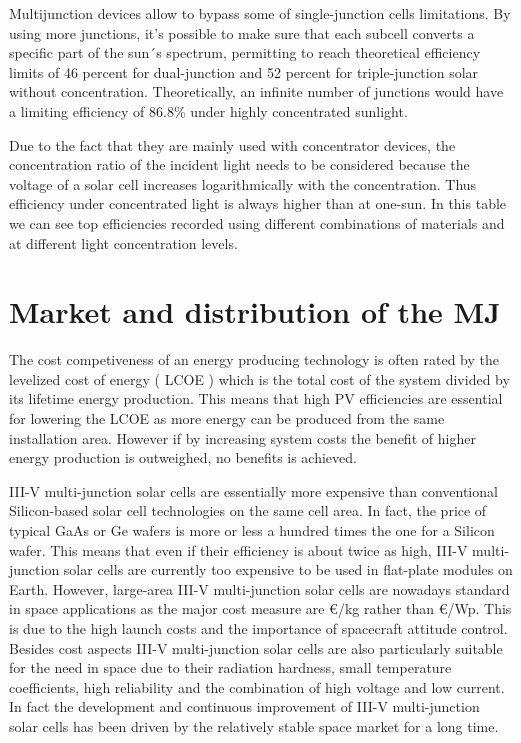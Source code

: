 \documentclass[11pt]{article} %
\begin{document}
Multijunction devices allow to bypass some of single-junction cells limitations. By using more junctions, it's possible to make sure that each subcell converts a specific part of the sun´s spectrum, permitting to reach theoretical efficiency limits of 46 percent for dual-junction and 52 percent for triple-junction solar without concentration. Theoretically, an infinite number of junctions would have a limiting efficiency of 86.8\% under highly concentrated sunlight.

Due to the fact that they are mainly used with concentrator devices, the concentration ratio of the incident light needs to be considered because the voltage of a solar cell increases logarithmically with the  concentration. Thus efficiency  under  concentrated  light is  always  higher  than  at one-sun. In this table we can see top efficiencies  recorded using different combinations of materials and at different light concentration levels.

\section{Market and distribution of the MJ}

The cost competiveness of an energy producing technology is often rated by the levelized cost of energy ( LCOE )  which is  the  total  cost  of  the  system  divided  by  its  lifetime  energy production. This means that high PV efficiencies  are  essential  for lowering  the  LCOE  as  more  energy can  be produced from the same installation area. However if by increasing system costs the  benefit  of  higher  energy  production is outweighed, no benefits is achieved.   

III-V multi-junction solar  cells  are essentially more expensive than conventional Silicon-based solar cell technologies on the same cell area. In fact, the price of typical GaAs or Ge wafers is more or less a hundred times the one for a Silicon wafer. This means that even if their efficiency is about twice as high, III-V multi-junction solar cells are currently too expensive to be used in flat-plate modules on Earth.   However, large-area III-V multi-junction solar cells are nowadays standard in space applications as the major cost measure are €/kg rather than €/Wp. This is due to the high launch costs and the importance of spacecraft attitude control. Besides cost aspects III-V multi-junction solar cells  are  also  particularly  suitable  for  the  need  in  space  due  to  their  radiation  hardness,  small temperature coefficients, high reliability and the combination of high voltage and low current. In fact the development and continuous improvement of III-V multi-junction solar cells has been driven by the relatively stable space market for a long time.  
\end{document}
